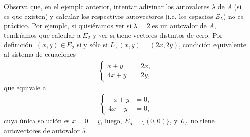 Observa que, en el ejemplo anterior, intentar adivinar
los autovalores $\lambda$ de $A$ (si es que existen)
y calcular los respectivos autovectores 
(i.e. los espacios $E_{\lambda}$) no es práctico. Por
ejemplo, si quisiéramos ver si $\lambda = 2$
es un autovalor de $A$, tendríamos que calcular a 
$E_{2}$ y ver si tiene vectores distintos de cero.
Por definición,
$(x, y) \in E_{2}$ si y sólo si 
$L_{A}(x, y) = (2x, 2y)$, condición equivalente al sistema
de ecuaciones
\begin{align*}
\begin{cases}
x + y & = 2x, \\
4x+y & = 2y,
\end{cases}
\end{align*}
que equivale a 
\begin{align*}
\begin{cases}
-x + y & = 0, \\
4x - y & = 0,
\end{cases}
\end{align*}
cuya única solución es $x = 0 = y$, luego,
$E_{5} = \{ (0, 0) \}$, y $L_{A}$ no tiene autovectores
de autovalor $5$.


